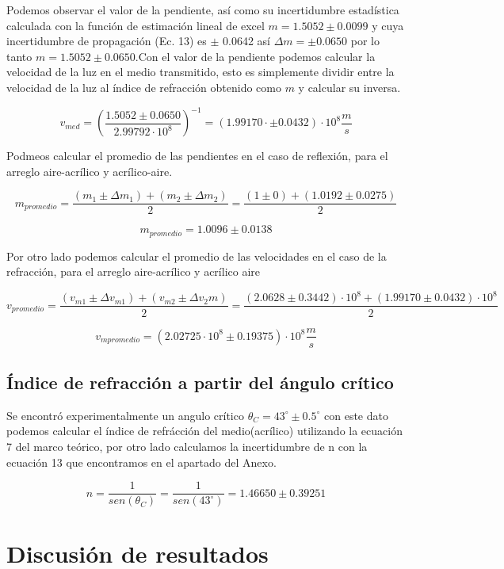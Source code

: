 \documentclass[article,12pt]{elsarticle}
\begin{document}
\begin{enumerate}
Podemos observar el valor de la pendiente, así como su incertidumbre estadística calculada con la función de estimación lineal de excel $m=1.5052\pm 0.0099$ y cuya incertidumbre de propagación (Ec. 13) es $\pm$ 0.0642 así $\Delta m = \pm 0.0650$ por lo tanto $m = 1.5052 \pm 0.0650$.Con el valor de la pendiente podemos calcular la velocidad de la luz en el medio transmitido, esto es simplemente dividir entre la velocidad de la luz al índice de refracción obtenido como $m$ y calcular su inversa.

\begin{equation}
    v_{med} = \left( \frac{1.5052\pm 0.0650}{2.99792 \cdot 10^8} \right)^{-1} = \left(1.99170 \cdot  \pm 0.0432\right) \cdot 10^8 \frac{m}{s}
\end{equation}

Podmeos calcular el promedio de las pendientes en el caso de reflexión, para el arreglo aire-acrílico y acrílico-aire.

\[m_{promedio} = \frac{(m_1\pm \Delta m_1 )+(m_2 \pm \Delta m_2)}{2}= \frac{(1\pm0)+(1.0192\pm 0.0275)}{2}\]

\[m_{promedio}=1.0096\pm 0.0138 \]

Por otro lado podemos calcular el promedio de las velocidades en el caso de la refracción, para el arreglo aire-acrílico y acrílico aire

\[ v_{promedio}= \frac{(v_{m1}\pm \Delta v_{m1})+(v_{m2}\pm \Delta {v_2m})}{2}=\frac{(2.0628\pm 0.3442)\cdot 10^8+(1.99170\pm 0.0432 )\cdot10^8}{2}\]

\[v_{mpromedio}=\left(2.02725\cdot10^8\pm 0.19375\right)\cdot10^8\frac{m}{s}\]

\subsection{Índice de refracción a partir del ángulo crítico}

 Se encontró experimentalmente un angulo crítico $\theta_C=43^{\circ}\pm 0.5^{\circ}$ con este dato podemos calcular el índice de refrácción del medio(acrílico) utilizando la ecuación 7 del marco teórico, por otro lado calculamos la incertidumbre de n con la ecuación 13 que encontramos en el apartado del Anexo.

 \[n= \frac{1}{sen(\theta_C)}= \frac{1}{sen(43^{\circ})}= 1.46650\pm 0.39251\]

\section{Discusión de resultados}


\end{enumerate}
\end{document}
